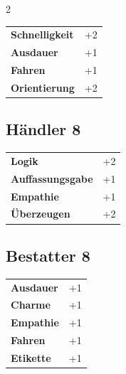 \begin{multicols}{2}
\begin{tcolorbox}
\begin{tabular}{@{}ll@{}}
    \textbf{Schnelligkeit} & +2\\
    \textbf{Ausdauer} & +1\\
    \textbf{Fahren} & +1\\
    \textbf{Orientierung} & +2\\
\end{tabular}


\end{tcolorbox}

\begin{tcolorbox}
    \subsection*{Händler \hfill \small{8 }}
    \tcblower




\begin{tabular}{@{}ll@{}}
    \textbf{Logik} & +2\\
    \textbf{Auffassungsgabe} & +1\\
    \textbf{Empathie} & +1\\
    \textbf{Überzeugen} & +2\\
\end{tabular}


\end{tcolorbox}

\begin{tcolorbox}
    \subsection*{Bestatter \hfill \small{8 }}
    \tcblower




\begin{tabular}{@{}ll@{}}
    \textbf{Ausdauer} & +1\\
    \textbf{Charme} & +1\\
    \textbf{Empathie} & +1\\
    \textbf{Fahren} & +1\\
    \textbf{Etikette} & +1\\
\end{tabular}


\end{tcolorbox}
\end{multicols}

